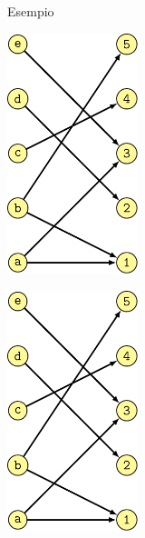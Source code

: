 \begin{frame}{Esempio}

\begin{overprint}
\begin{center}
\includegraphics[height=7cm,page=1]{bipartite.pdf}
\end{center}
\begin{center}
\includegraphics[height=7cm,page=2]{bipartite.pdf}
\end{center}
\end{overprint}
  
\end{frame}
    

